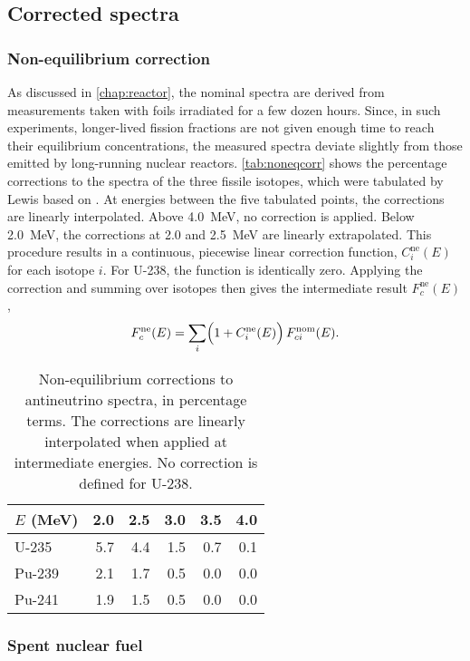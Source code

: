 \documentclass[../thesis.tex]{subfiles}
\begin{document}
\subsection{Corrected spectra}
\label{sec:corrspectra}

\subsubsection{Non-equilibrium correction}
\label{sec:noneqcorrspectra}

As discussed in \autoref{chap:reactor}, the nominal spectra are derived from measurements taken with foils irradiated for a few dozen hours. Since, in such experiments, longer-lived fission fractions are not given enough time to reach their equilibrium concentrations, the measured spectra deviate slightly from those emitted by long-running nuclear reactors. \autoref{tab:noneqcorr} shows the percentage corrections to the spectra of the three fissile isotopes, which were tabulated by Lewis \cite{Lewis} based on \cite{Mueller_2011}. At energies between the five tabulated points, the corrections are linearly interpolated. Above 4.0~MeV, no correction is applied. Below 2.0~MeV, the corrections at 2.0 and 2.5~MeV are linearly extrapolated. This procedure results in a continuous, piecewise linear correction function, $C^\mathrm{ne}_i(E)$ for each isotope $i$. For U-238, the function is identically zero. Applying the correction and summing over isotopes then gives the intermediate result $F^\mathrm{ne}_c(E)$,
\[ F^\mathrm{ne}_c(E) = \sum_i \Bigl(1 + C^\mathrm{ne}_i(E)\Bigr)\,
  F^\mathrm{nom}_{ci}(E). \]

\begin{table}
  \centering
  \begin{tabular}{lrrrrr}
    \toprule
    $E$ (MeV) & 2.0 & 2.5 & 3.0 & 3.5 & 4.0 \\
    \midrule
    U-235 & 5.7 & 4.4 & 1.5 & 0.7 & 0.1 \\
    Pu-239 & 2.1 & 1.7 & 0.5 & 0.0 & 0.0 \\
    Pu-241 & 1.9 & 1.5 & 0.5 & 0.0 & 0.0 \\
    \bottomrule
  \end{tabular}
  \caption{Non-equilibrium corrections to antineutrino spectra, in percentage terms. The corrections are linearly interpolated when applied at intermediate energies. No correction is defined for U-238.}
  \label{tab:noneqcorr}
\end{table}

\subsubsection{Spent nuclear fuel}
\label{sec:snfcorrspectra}
\end{document}
